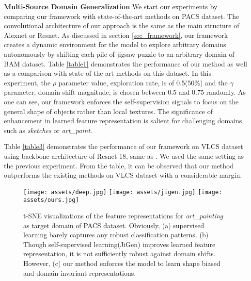 \documentclass[10pt,twocolumn,letterpaper]{article}
\begin{document}
\vspace{2mm}
\noindent
\textbf{Multi-Source Domain Generalization}\quad
We start our experiments by comparing our framework with state-of-the-art methods on PACS dataset\cite{li2017deeper}. 
The convolutional architecture of our approach is the same as the main structure of Alexnet or Resnet.
As discussed in section \ref{sec_framework}, our framework creates a dynamic environment for the model to explore arbitrary domains autonomously by shifting each pile of jigsaw puzzle to an arbitrary domain of BAM dataset. Table \ref{table1} demonstrates the performance of our method as well as a comparison with state-of-the-art methods on this dataset.
In this experiment, the $\rho$ parameter value, exploration rate, is of 0.5(50\%) and the $\gamma$ parameter, domain shift magnitude, is chosen between 0.5 and 0.75 randomly.
As one can see, our framework enforces the self-supervision signals to focus on the general shape of objects rather than local textures.
The significance of enhancement in learned feature representation is salient for challenging domains such as \textit{sketches} or \textit{art\_paint}.

Table \ref{table3} demonstrates the performance of our framework on VLCS\cite{torralba2011unbiased} dataset using backbone architecture of Resnet-18, same as \cite{carlucci2019domain}. We used the same setting as the previous experiment. From the table, it can be observed that our method outperforms the existing methods on VLCS \cite{torralba2011unbiased} dataset with a considerable margin.

\begin{figure*}[t!]
	\begin{center}
		\texttt{[image: assets/deep.jpg]}
		\hspace{3mm}
		\texttt{[image: assets/jigen.jpg]}
		\hspace{3mm}
		\texttt{[image: assets/ours.jpg]}
	\end{center}
	\caption{t-SNE visualizations of the feature representations for \textit{art\_painting} as target domain of PACS dataset. Obviously, (a) supervised learning barely captures any robust classification patterns. (b) Though self-supervised learning(JiGen\cite{carlucci2019domain}) improves learned feature representation, it is not sufficiently robust against domain shifts. However, (c) our method enforces the model to learn shape biased and domain-invariant representations.}
	\label{figure4}
\end{figure*}
\end{document}
